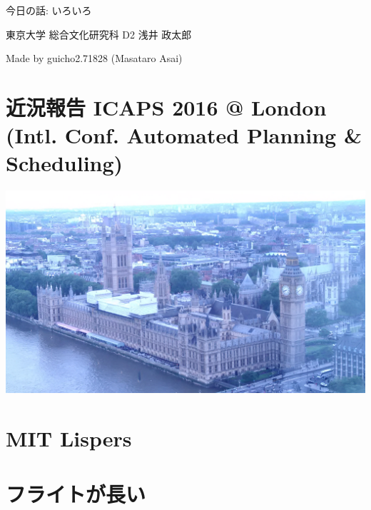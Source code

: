\begin{outline-text-1}
\begin{xlarge}
\begin{center}
今日の話: いろいろ
\end{center}
\end{xlarge}

\begin{center}
東京大学 総合文化研究科 D2 浅井 政太郎
\end{center}

\begin{note}
\begin{alignright}
Made by guicho2.71828 (Masataro Asai)
\end{alignright}
\end{note}
\end{outline-text-1}

\section{近況報告 ICAPS 2016 @ London (Intl. Conf. Automated Planning \& Scheduling)}
\label{sec-1}

\includegraphics{img/static/bigben.jpg}

\section{MIT Lispers}
\label{sec-2}



\section{フライトが長い}
\label{sec-3}

